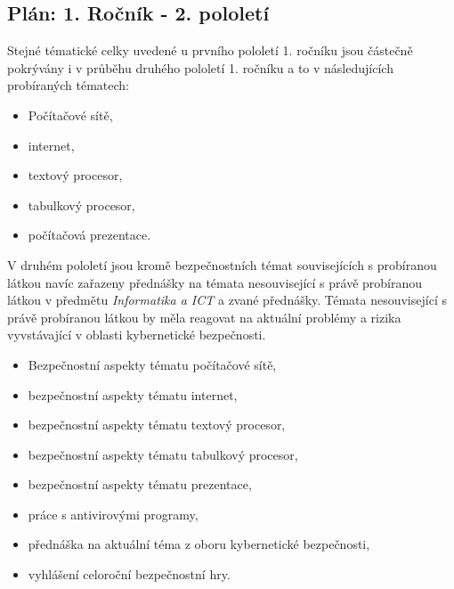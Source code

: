 \documentclass[a4paper, 12pt]{article}
\begin{document}
\subsection{Plán: 1. Ročník - 2. pololetí}
Stejné tématické celky uvedené u prvního pololetí 1. ročníku jsou částečně pokrývány i v průběhu druhého pololetí 1. ročníku a to v následujících probíraných tématech:
\begin{itemize}
    \setlength{\itemsep}{-3pt}
    \item Počítačové sítě,
    \item internet,
    \item textový procesor,
    \item tabulkový procesor,
    \item počítačová prezentace.
\end{itemize}

V druhém pololetí jsou kromě bezpečnostních témat souvisejících s probíranou látkou navíc zařazeny přednášky na témata nesouvisející s právě probíranou látkou v předmětu \textit{Informatika a ICT} a zvané přednášky. Témata nesouvisející s právě probíranou látkou by měla reagovat na aktuální problémy a rizika vyvstávající v oblasti kybernetické bezpečnosti.

\begin{itemize}
    \setlength{\itemsep}{-3pt}
    \item Bezpečnostní aspekty tématu počítačové sítě,
    \item bezpečnostní aspekty tématu internet,
    \item bezpečnostní aspekty tématu textový procesor,
    \item bezpečnostní aspekty tématu tabulkový procesor,
    \item bezpečnostní aspekty tématu prezentace,
    \item práce s antivirovými programy,
    \item přednáška na aktuální téma z oboru kybernetické bezpečnosti,
    \item vyhlášení celoroční bezpečnostní hry.
\end{itemize}
\end{document}
